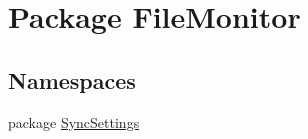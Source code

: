 \hypertarget{namespace_file_monitor}{\section{Package File\-Monitor}
\label{namespace_file_monitor}
}
\subsection*{Namespaces}
\begin{DoxyCompactItemize}
\item 
package \hyperlink{namespace_file_monitor_1_1_sync_settings}{Sync\-Settings}
\end{DoxyCompactItemize}
